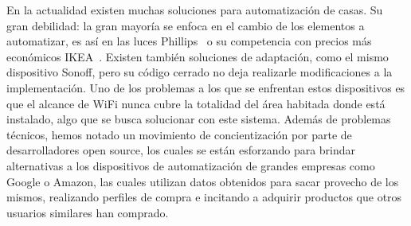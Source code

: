 En la actualidad existen muchas soluciones para automatización de casas. Su gran debilidad: la gran mayoría se enfoca en el cambio de los elementos a automatizar, es así en las luces Phillips~\cite{phillips-lighting} o su competencia con precios más económicos IKEA~\cite{ikea-lighting}. Existen también soluciones de adaptación, como el mismo dispositivo Sonoff, pero su código cerrado no deja realizarle modificaciones a la implementación. 
Uno de los problemas a los que se enfrentan estos dispositivos es que el alcance de WiFi nunca cubre la totalidad del área habitada donde está instalado, algo que se busca solucionar con este sistema. Además de problemas técnicos, hemos notado un movimiento de concientización por parte de desarrolladores open source, los cuales se están esforzando para brindar alternativas a los dispositivos de automatización de grandes empresas como Google o Amazon, las cuales utilizan datos obtenidos para sacar provecho de los mismos, realizando perfiles de compra e incitando a adquirir productos que otros usuarios similares han comprado.

